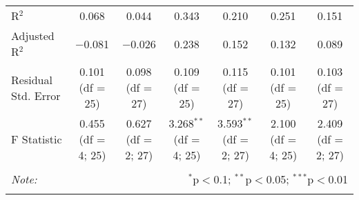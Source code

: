 \documentclass{article}
\begin{document}
\begin{sidewaystable}[!htbp]
\begin{tabular}{@{\extracolsep{5pt}}lcccccc}
R$^{2}$ & 0.068 & 0.044 & 0.343 & 0.210 & 0.251 & 0.151 \\ 
Adjusted R$^{2}$ & $-$0.081 & $-$0.026 & 0.238 & 0.152 & 0.132 & 0.089 \\ 
Residual Std. Error & 0.101 (df = 25) & 0.098 (df = 27) & 0.109 (df = 25) & 0.115 (df = 27) & 0.101 (df = 25) & 0.103 (df = 27) \\ 
F Statistic & 0.455 (df = 4; 25) & 0.627 (df = 2; 27) & 3.268$^{**}$ (df = 4; 25) & 3.593$^{**}$ (df = 2; 27) & 2.100 (df = 4; 25) & 2.409 (df = 2; 27) \\ 
\hline 
\hline \\[-1.8ex] 
\textit{Note:}  & \multicolumn{6}{r}{$^{*}$p$<$0.1; $^{**}$p$<$0.05; $^{***}$p$<$0.01} \\ 
\normalsize 
\end{tabular} 
\end{sidewaystable} 
\end{document}
